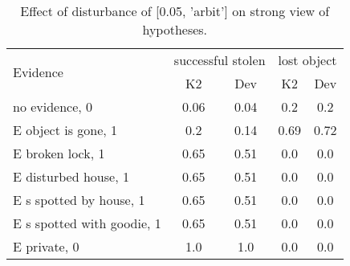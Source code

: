 \begin{table}\begin{tabular}{l|cc|cc}\toprule\multirow{2}{*}{Evidence} & \multicolumn{2}{c}{successful stolen}& \multicolumn{2}{c}{lost object}\\& {K2} & {Dev}& {K2} & {Dev}\\\midrule
no evidence, 0 & 0.06&0.04&0.2&0.2\\E object is gone, 1 & \cellcolor{Bittersweet}0.2&\cellcolor{Bittersweet}0.14&0.69&0.72\\E broken lock, 1 & \cellcolor{Bittersweet}0.65&\cellcolor{Bittersweet}0.51&0.0&0.0\\E disturbed house, 1 & \cellcolor{Bittersweet}0.65&\cellcolor{Bittersweet}0.51&0.0&0.0\\E s spotted by house, 1 & \cellcolor{Bittersweet}0.65&\cellcolor{Bittersweet}0.51&0.0&0.0\\E s spotted with goodie, 1 & \cellcolor{Bittersweet}0.65&\cellcolor{Bittersweet}0.51&0.0&0.0\\E private, 0 & 1.0&1.0&0.0&0.0\\\bottomrule\end{tabular}\caption{Effect of disturbance of [0.05, 'arbit'] on strong view of hypotheses.}\end{table}